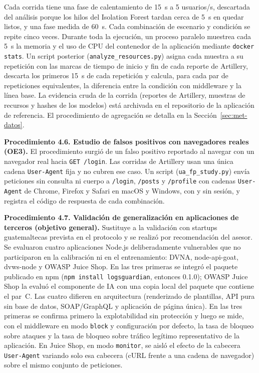 Cada corrida tiene una fase de calentamiento de 15~s a 5 usuarios/s, descartada del análisis
porque los hilos del Isolation Forest tardan cerca de 5~s en quedar listos, y una fase medida de
60~s. Cada combinación de escenario y condición se repite cinco veces. Durante toda la ejecución,
un proceso paralelo muestrea cada 5~s la memoria y el uso de CPU del contenedor de la aplicación
mediante \texttt{docker stats}. Un script posterior (\texttt{analyze\_resources.py}) asigna cada
muestra a su repetición con las marcas de tiempo de inicio y fin de cada reporte de Artillery,
descarta los primeros 15~s de cada repetición y calcula, para cada par de repeticiones
equivalentes, la diferencia entre la condición con middleware y la línea base. La evidencia
cruda de la corrida (reportes de Artillery, muestras de recursos y hashes de los modelos) está
archivada en el repositorio de la aplicación de referencia. El procedimiento de agregación se
detalla en la Sección~\ref{sec:met-datos}.

\textbf{Procedimiento 4.6. Estudio de falsos positivos con navegadores reales (OE3).} El
procedimiento surgió de un falso positivo reportado al navegar con un navegador real hacia
\texttt{GET /login}. Las corridas de Artillery usan una única cadena \texttt{User-Agent} fija y no
cubren ese caso. Un script (\texttt{ua\_fp\_study.py}) envía peticiones sin consulta ni cuerpo a
\texttt{/login}, \texttt{/posts} y \texttt{/profile} con cadenas \texttt{User-Agent} de Chrome,
Firefox y Safari en macOS y Windows, con y sin sesión, y registra el código de respuesta de cada
combinación.

\textbf{Procedimiento 4.7. Validación de generalización en aplicaciones de terceros (objetivo
general).} Sustituye a la validación con startups guatemaltecas prevista en el protocolo y se
realizó por recomendación del asesor. Se evaluaron cuatro aplicaciones Node.js deliberadamente vulnerables que no participaron en la
calibración ni en el entrenamiento: DVNA, node-api-goat, dvws-node y OWASP Juice Shop. En las tres
primeras se integró el paquete publicado en npm (\texttt{npm install logsguardian}, entonces 0.1.0);
OWASP Juice Shop la evaluó el componente de IA con una copia local del paquete que contiene el
par~C. Las cuatro difieren en arquitectura (renderizado de
plantillas, API pura sin base de datos, SOAP/GraphQL y aplicación de página única). En las tres primeras se confirma primero la explotabilidad sin protección y luego se mide, con el
middleware en modo \texttt{block} y configuración por defecto, la tasa de bloqueo sobre ataques y la tasa de bloqueo
sobre tráfico legítimo representativo de la aplicación. En Juice Shop, en modo \texttt{monitor},
se aisló el efecto de la cabecera \texttt{User-Agent} variando solo esa cabecera (cURL frente a
una cadena de navegador) sobre el mismo conjunto de peticiones.

